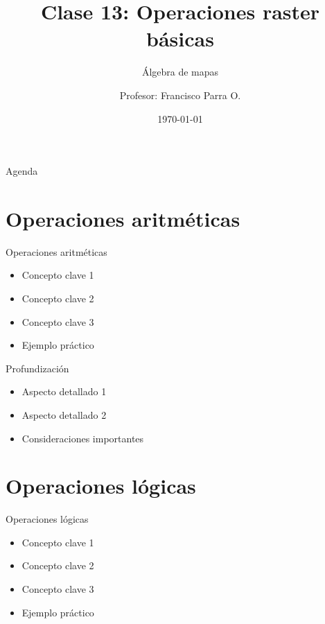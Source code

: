 \documentclass[10pt]{beamer}
\title{Clase 13: Operaciones raster básicas}
\subtitle{Álgebra de mapas}
\author{Profesor: Francisco Parra O.}
\institute{USACH - Ingeniería Civil en Informática}
\date{\today}
\begin{document}
\maketitle

\begin{frame}{Agenda}
    \tableofcontents
\end{frame}


\section{Operaciones aritméticas}

\begin{frame}{Operaciones aritméticas}
    \begin{itemize}
        \item Concepto clave 1
        \item Concepto clave 2
        \item Concepto clave 3
        \item Ejemplo práctico
    \end{itemize}
\end{frame}

\begin{frame}{Profundización}
    \begin{itemize}
        \item Aspecto detallado 1
        \item Aspecto detallado 2
        \item Consideraciones importantes
    \end{itemize}
\end{frame}

\section{Operaciones lógicas}

\begin{frame}{Operaciones lógicas}
    \begin{itemize}
        \item Concepto clave 1
        \item Concepto clave 2
        \item Concepto clave 3
        \item Ejemplo práctico
    \end{itemize}
\end{frame}
\end{document}
